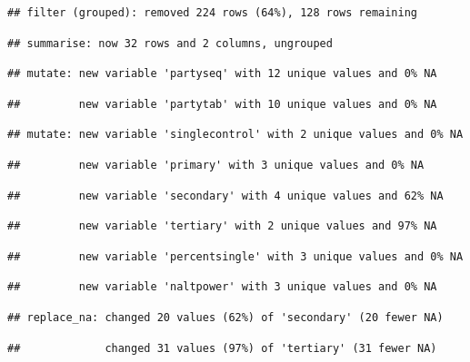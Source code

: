 \documentclass[]{article}
\begin{document}
\begin{verbatim}
## filter (grouped): removed 224 rows (64%), 128 rows remaining
\end{verbatim}

\begin{verbatim}
## summarise: now 32 rows and 2 columns, ungrouped
\end{verbatim}

\begin{verbatim}
## mutate: new variable 'partyseq' with 12 unique values and 0% NA
\end{verbatim}

\begin{verbatim}
##         new variable 'partytab' with 10 unique values and 0% NA
\end{verbatim}

\begin{verbatim}
## mutate: new variable 'singlecontrol' with 2 unique values and 0% NA
\end{verbatim}

\begin{verbatim}
##         new variable 'primary' with 3 unique values and 0% NA
\end{verbatim}

\begin{verbatim}
##         new variable 'secondary' with 4 unique values and 62% NA
\end{verbatim}

\begin{verbatim}
##         new variable 'tertiary' with 2 unique values and 97% NA
\end{verbatim}

\begin{verbatim}
##         new variable 'percentsingle' with 3 unique values and 0% NA
\end{verbatim}

\begin{verbatim}
##         new variable 'naltpower' with 3 unique values and 0% NA
\end{verbatim}

\begin{verbatim}
## replace_na: changed 20 values (62%) of 'secondary' (20 fewer NA)
\end{verbatim}

\begin{verbatim}
##             changed 31 values (97%) of 'tertiary' (31 fewer NA)
\end{verbatim}
\end{document}
